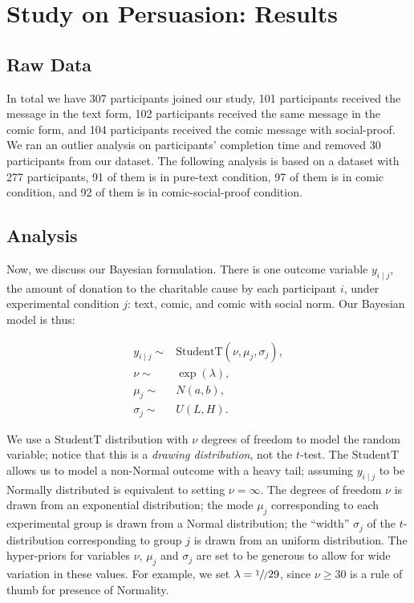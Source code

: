 \section{Study on Persuasion: Results}
\label{sec:Study on Behavior Results}

\subsection{Raw Data}
\label{sub:Study on Behavior Raw Data}
In total we have 307 participants joined our study, 101 participants received the message in the text form, 102 participants received the same message in the comic form, and 104 participants received the comic message with social-proof. We ran an outlier analysis on participants' completion time and removed 30 participants from our dataset. The following analysis is based on a dataset with 277 participants, 91 of them is in pure-text condition, 97 of them is in comic condition, and 92 of them is in comic-social-proof condition.



\subsection{Analysis}
\label{sub:Study on Behavior Analysis}

Now, we discuss our Bayesian formulation. There is one outcome variable $y_{i \mid j}$, the amount of donation to the charitable cause by each participant $i$, under experimental condition $j$: text, comic, and comic with social norm. Our Bayesian model is thus:

\begin{align}
    y_{i \mid j} \sim &  \mathrm{StudentT}(\nu, \mu_j, \sigma_j), \\
    \nu \sim & \exp(\lambda), \\
    \mu_j \sim & N(a,b), \\
    \sigma_j \sim & U(L,H).
\end{align}

We use a $\mathrm{StudentT}$ distribution with $\nu$ degrees of freedom to model the random variable; notice that this is a \textit{drawing distribution}, not the $t$-test. The $\mathrm{StudentT}$ allows us to model a non-Normal outcome with a heavy tail; assuming $y_{i \mid j}$ to be Normally distributed is equivalent to setting $\nu=\infty$. The degrees of freedom $\nu$ is drawn from an exponential distribution; the mode $\mu_j$ corresponding to each experimental group is drawn from a Normal distribution; the ``width'' $\sigma_j$ of the $t$-distribution corresponding to group $j$ is drawn from an uniform distribution. The hyper-priors for variables $\nu$, $\mu_j$ and $\sigma_j$ are set to be generous to allow for wide variation in these values. For example, we set $\lambda=\sfrac{1}/{29}$, since $\nu \geq 30$ is a rule of thumb for presence of Normality.

